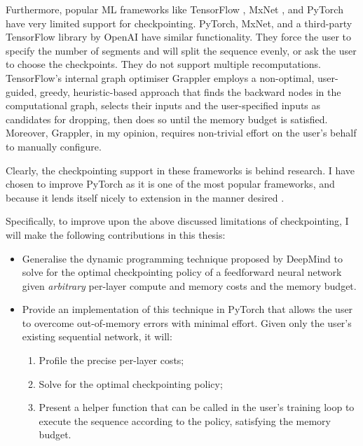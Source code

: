 Furthermore, popular ML frameworks like TensorFlow \cite{tensorflow2015-whitepaper}, MxNet \cite{mxnet2015}, and PyTorch \cite{Paszke2017} have very limited support for checkpointing. PyTorch, MxNet, and a third-party TensorFlow library by OpenAI \cite{openai-checkpointing} have similar functionality. They force the user to specify the number of segments and will split the sequence evenly, or ask the user to choose the checkpoints. They do not support multiple recomputations. TensorFlow's internal graph optimiser Grappler employs a non-optimal, user-guided, greedy, heuristic-based approach that finds the backward nodes in the computational graph, selects their inputs and the user-specified inputs as candidates for dropping, then does so until the memory budget is satisfied. Moreover, Grappler, in my opinion, requires non-trivial effort on the user's behalf to manually configure.

Clearly, the checkpointing support in these frameworks is behind research. I have chosen to improve PyTorch as it is one of the most popular frameworks, and because it lends itself nicely to extension in the manner desired .

Specifically, to improve upon the above discussed limitations of checkpointing, I will make the following contributions in this thesis:
\begin{itemize}[topsep=0pt]
    \item Generalise the dynamic programming technique proposed by DeepMind to solve for the optimal checkpointing policy of a feedforward neural network given \textit{arbitrary} per-layer compute and memory costs and the memory budget.
    \item Provide an implementation of this technique in PyTorch that allows the user to overcome out-of-memory errors with minimal effort. Given only the user's existing sequential network, it will:
    \begin{enumerate}
        \item Profile the precise per-layer costs;
        \item Solve for the optimal checkpointing policy;
        \item Present a helper function that can be called in the user's training loop to execute the sequence according to the policy, satisfying the memory budget.
    \end{enumerate}
\end{itemize}
